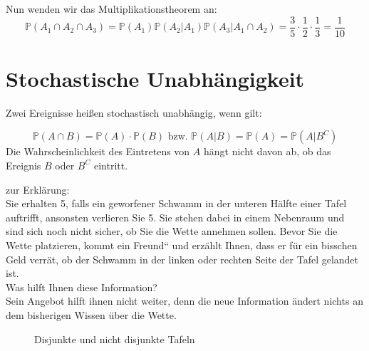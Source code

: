 {\begin{bsp}
    Nun wenden wir das Multiplikationstheorem an:
    \[
    \mathbb P\left(A_{1}\cap A_{2}\cap A_{3}\right)=
    \mathbb P\left(A_{1}\right)\mathbb P\left(A_{2}|A_{1}\right)\mathbb P\left(A_{3}|A_{1}\cap A_{2}\right)=
    \frac{3}{5}\cdot \frac{1}{2}\cdot \frac{1}{3}=\frac{1}{10}
    \]

    \end{bsp}

    
    \section{Stochastische Unabhängigkeit}

    Zwei Ereignisse heißen stochastisch unabhängig, wenn gilt:

    \[
        \mathbb P\left(A\cap B\right)=
        \mathbb P\left(A\right)\cdot \mathbb P\left(B\right)\text{ bzw. }
        \mathbb P\left(A|B\right)=\mathbb P\left(A\right)=\mathbb P\left(A|B^{C}\right)
    \]
    Die Wahrscheinlichkeit des Eintretens von $A$ hängt nicht davon ab, ob das Ereignis $B$ oder $B^C$ eintritt.

    \begin{bsp} zur Erklärung: \\
        Sie erhalten 5{\texteuro}, falls
        ein geworfener Schwamm in der unteren Hälfte einer Tafel auftrifft,
        ansonsten verlieren Sie 5{\texteuro}. Sie stehen dabei in einem
        Nebenraum und sind sich noch nicht sicher, ob Sie die Wette annehmen 
        sollen. Bevor Sie die Wette platzieren, kommt ein {\quotedblbase}Freund{\textquotedblleft}
        und erzählt Ihnen, dass er für ein bisschen Geld verrät, 
        ob der Schwamm in der linken oder rechten Seite der Tafel gelandet ist.\\

        Was hilft Ihnen diese Information?\\

        Sein Angebot hilft ihnen nicht weiter, denn die neue Information ändert nichts
        an dem bisherigen Wissen über die Wette.
    \end{bsp}

    \begin{figure}
    \centering
    \caption{Disjunkte und nicht disjunkte Tafeln}
    \label{fig:tafeln}
    \end{figure}

}
